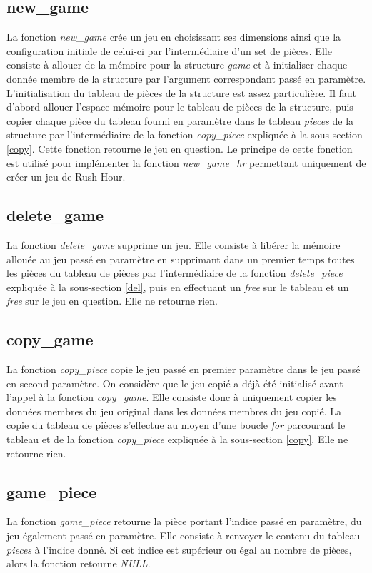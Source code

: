 \documentclass{report}
\begin{document}
\subsection{new\_game}
La fonction \emph{new\_game} crée un jeu en choisissant ses dimensions ainsi que la configuration initiale de celui-ci par l'intermédiaire d'un set de pièces. Elle consiste à allouer de la mémoire pour la structure \emph{game} et à initialiser chaque donnée membre de la structure par l'argument correspondant passé en paramètre. L'initialisation du tableau de pièces de la structure est assez particulière. Il faut d'abord allouer l'espace mémoire pour le tableau de pièces de la structure, puis copier chaque pièce du tableau fourni en paramètre dans le tableau \emph{pieces} de la structure par l'intermédiaire de la fonction \emph{copy\_piece} expliquée à la sous-section \ref{copy}. Cette fonction retourne le jeu en question. Le principe de cette fonction est utilisé pour implémenter la fonction \emph{new\_game\_hr} permettant uniquement de créer un jeu de Rush Hour.
\subsection{delete\_game}
La fonction \emph{delete\_game} supprime un jeu. Elle consiste à libérer la mémoire allouée au jeu passé en paramètre en supprimant dans un premier temps toutes les pièces du tableau de pièces par l'intermédiaire de la fonction \emph{delete\_piece} expliquée à la sous-section \ref{del}, puis en effectuant un \emph{free} sur le tableau et un \emph{free} sur le jeu en question. Elle ne retourne rien.
\subsection{copy\_game}
La fonction \emph{copy\_piece} copie le jeu passé en premier paramètre dans le jeu passé en second paramètre. On considère que le jeu copié a déjà été initialisé avant l'appel à la fonction \emph{copy\_game}. Elle consiste donc à uniquement copier les données membres du jeu original dans les données membres du jeu copié. La copie du tableau de pièces s'effectue au moyen d'une boucle \emph{for} parcourant le tableau et de la fonction \emph{copy\_piece} expliquée à la sous-section \ref{copy}. Elle ne retourne rien.
\subsection{game\_piece}
La fonction \emph{game\_piece} retourne la pièce portant l'indice passé en paramètre, du jeu également passé en paramètre. Elle consiste à renvoyer le contenu du tableau \emph{pieces} à l'indice donné. Si cet indice est supérieur ou égal au nombre de pièces, alors la fonction retourne \emph{NULL}.
\end{document}
